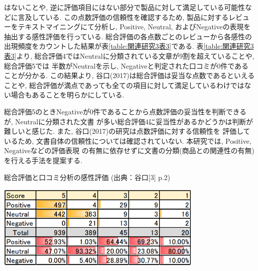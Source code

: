 \documentclass{ltjarticle}
\begin{document}
\noindent
はないことや, 逆に評価項目にはない部分で製品に対して満足している可能性などに言及している. 
この点数評価の信頼性を確認するため, 製品に対するレビューをテキストマイニングにて分析し, 
Positive, Neutral, およびNegativeの表現を抽出する感性評価を行っている. 
総合評価の各点数ごとのレビューから各感性の出現頻度をカウントした結果が表\ref{table:関連研究3表3}である. 
表\ref{table:関連研究3表3}より, 総合評価4ではNeutralに分類されている文章が9割を超えていることや, 総合評価5では
半数がNeutralを示し, Negativeと判定された口コミが0件であることが分かる. 
この結果より, 谷口(2017)は総合評価は妥当な点数であるといえることや, 
総合評価が満点であっても全ての項目に対して満足しているわけではない場合もあることを明らかにしている. 

総合評価5のときNegativeが0件であることから点数評価の妥当性を判断できるが, Neutralに分類された文書
が多い総合評価4に妥当性があるかどうかは判断が難しいと感じた. また, 谷口(2017)の研究は点数評価に対する信頼性を
評価しているため, 文書自体の信頼性については確認されていない. 本研究では, Positive, Negativeなどの評価表現
の有無に依存せずに文書の分類(商品との関連性の有無)を行える手法を提案する. 


\begin{table}[h]
    \centering
    \caption{総合評価と口コミ分析の感性評価 (出典：谷口[3] p.2)}
    \vspace{5truept}
    \includegraphics[width = 10cm]{images/関連研究3表3.png}
    \label{table:関連研究3表3}
\end{table}

\newpage
\end{document}
